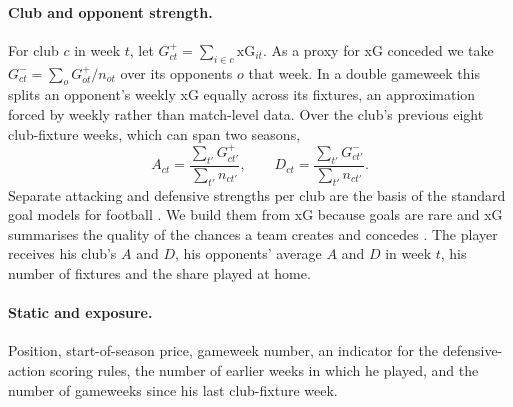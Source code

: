 \documentclass[11pt,a4paper]{article}
\begin{document}
\paragraph{Club and opponent strength.} For club $c$ in week $t$, let
$G^{+}_{ct}=\sum_{i\in c}\mathrm{xG}_{it}$. As a proxy for xG conceded we take
$G^{-}_{ct}=\sum_{o} G^{+}_{ot}/n_{ot}$ over its opponents $o$ that week. In a double gameweek this
splits an opponent's weekly xG equally across its fixtures, an approximation forced by weekly
rather than match-level data. Over the club's previous eight club-fixture weeks, which can span
two seasons,
\[
  A_{ct} = \frac{\sum_{t'} G^{+}_{ct'}}{\sum_{t'} n_{ct'}}, \qquad
  D_{ct} = \frac{\sum_{t'} G^{-}_{ct'}}{\sum_{t'} n_{ct'}}.
\]
Separate attacking and defensive strengths per club are the basis of the standard goal models for
football \citep{maher1982,dixoncoles1997}. We build them from xG because goals are rare and xG
summarises the quality of the chances a team creates and concedes \citep{rathke2017}. The player
receives his club's $A$ and $D$, his opponents' average $A$ and $D$ in week $t$, his number of
fixtures and the share played at home.

\paragraph{Static and exposure.} Position, start-of-season price, gameweek number, an indicator
for the defensive-action scoring rules, the number of earlier weeks in which he played, and the
number of gameweeks since his last club-fixture week.
\end{document}
